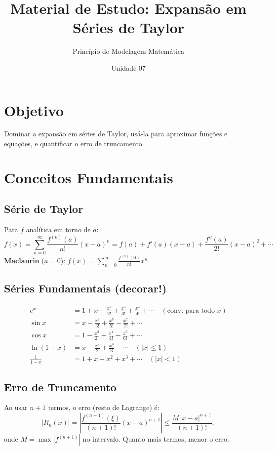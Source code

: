 \documentclass[12pt,a4paper]{article}
\title{Material de Estudo: Expans\~ao em S\'eries de Taylor}
\author{Princ\'ipio de Modelagem Matem\'atica}
\date{Unidade 07}
\begin{document}
\maketitle

\section*{Objetivo}
Dominar a expans\~ao em s\'eries de Taylor, us\'a-la para aproximar fun\c{c}\~oes e equa\c{c}\~oes, e quantificar o erro de truncamento.

\section*{Conceitos Fundamentais}

\subsection*{S\'erie de Taylor}
Para $f$ anal\'itica em torno de $a$:
\[
f(x) = \sum_{n=0}^{\infty} \frac{f^{(n)}(a)}{n!}(x-a)^n = f(a) + f'(a)(x-a) + \frac{f''(a)}{2!}(x-a)^2 + \cdots
\]
\textbf{Maclaurin} ($a=0$): $f(x) = \sum_{n=0}^\infty \frac{f^{(n)}(0)}{n!}x^n$.

\subsection*{S\'eries Fundamentais (decorar!)}
\begin{align*}
e^x &= 1 + x + \frac{x^2}{2!} + \frac{x^3}{3!} + \frac{x^4}{4!} + \cdots \quad (\text{conv.\ para todo } x) \\
\sin x &= x - \frac{x^3}{3!} + \frac{x^5}{5!} - \frac{x^7}{7!} + \cdots \\
\cos x &= 1 - \frac{x^2}{2!} + \frac{x^4}{4!} - \frac{x^6}{6!} + \cdots \\
\ln(1+x) &= x - \frac{x^2}{2} + \frac{x^3}{3} - \cdots \quad (|x| \le 1) \\
\frac{1}{1-x} &= 1 + x + x^2 + x^3 + \cdots \quad (|x| < 1)
\end{align*}

\subsection*{Erro de Truncamento}
Ao usar $n+1$ termos, o erro (resto de Lagrange) \'e:
\[
|R_n(x)| = \left|\frac{f^{(n+1)}(\xi)}{(n+1)!}(x-a)^{n+1}\right| \le \frac{M\,|x-a|^{n+1}}{(n+1)!},
\]
onde $M = \max|f^{(n+1)}|$ no intervalo. Quanto mais termos, menor o erro.
\end{document}
